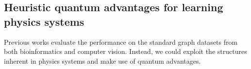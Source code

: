 
\subsection{Heuristic quantum advantages for learning physics systems}
Previous works evaluate the performance on the standard graph datasets from both bioinformatics and computer vision.
Instead, we could exploit the structures inherent in physics systems and make use of quantum advantages.

